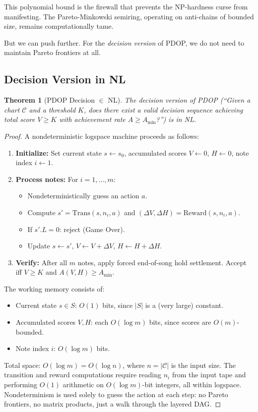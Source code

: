 \documentclass[11pt, letterpaper]{article}
\newtheorem{theorem}{Theorem}
\theoremstyle{definition}
\theoremstyle{remark}
\begin{document}
This polynomial bound is the firewall that prevents the NP-hardness curse from manifesting.
The Pareto-Minkowski semiring, operating on anti-chains of bounded size, remains computationally tame.

But we can push further.
For the \emph{decision version} of PDOP, we do not need to maintain Pareto frontiers at all.

\subsection{Decision Version in NL}

\begin{theorem}[PDOP Decision $\in$ NL]
\label{thm:nl}
The decision version of PDOP (``Given a chart $\mathcal{C}$ and a threshold $K$, does there exist a valid decision sequence achieving total score $V \ge K$ with achievement rate $A \ge A_{\min}$?'') is in NL.
\end{theorem}

\begin{proof}
A nondeterministic logspace machine proceeds as follows:
\begin{enumerate}[leftmargin=*]
    \item \textbf{Initialize:} Set current state $s \leftarrow s_0$, accumulated scores $V \leftarrow 0$, $H \leftarrow 0$, note index $i \leftarrow 1$.
    \item \textbf{Process notes:} For $i = 1, \ldots, m$:
    \begin{itemize}[leftmargin=*]
        \item Nondeterministically guess an action $a$.
        \item Compute $s' = \mathrm{Trans}(s, n_i, a)$ and $(\Delta V, \Delta H) = \mathrm{Reward}(s, n_i, a)$.
        \item If $s'.L = 0$: reject (Game Over).
        \item Update $s \leftarrow s'$, $V \leftarrow V + \Delta V$, $H \leftarrow H + \Delta H$.
    \end{itemize}
    \item \textbf{Verify:} After all $m$ notes, apply forced end-of-song hold settlement.  Accept iff $V \ge K$ and $A(V, H) \ge A_{\min}$.
\end{enumerate}
The working memory consists of:
\begin{itemize}[leftmargin=*]
    \item Current state $s \in S$: $O(1)$ bits, since $|S|$ is a (very large) constant.
    \item Accumulated scores $V, H$: each $O(\log m)$ bits, since scores are $O(m)$-bounded.
    \item Note index $i$: $O(\log m)$ bits.
\end{itemize}
Total space: $O(\log m) = O(\log n)$, where $n = |\mathcal{C}|$ is the input size.
The transition and reward computations require reading $n_i$ from the input tape and performing $O(1)$ arithmetic on $O(\log m)$-bit integers, all within logspace.
Nondeterminism is used solely to guess the action at each step: no Pareto frontiers, no matrix products, just a walk through the layered DAG.
\end{proof}
\end{document}
